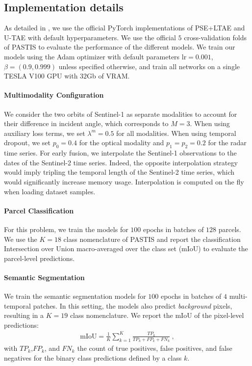 \subsection{Implementation details}
As detailed in , we use the official PyTorch implementations of PSE+LTAE and U-TAE with default hyperparameters.
We  use the official $5$ cross-validation folds of PASTIS \citep{garnot2021utae} to evaluate the performance of the different models. We train our models using the Adam optimizer \citep{kingma2014adam} with default parameters $\text{lr}=0.001$, $\beta=(0.9, 0.999)$ unless specified otherwise, and train all networks on a single TESLA V100 GPU with $32$Gb of VRAM. 

\paragraph{\bf Multimodality Configuration}  We consider the two orbits of Sentinel-1 as separate modalities to account for their difference in incident angle, which corresponds to $M=3$. When using auxiliary loss terms, we set $\lambda^m=0.5$ for all modalities. When using temporal dropout, we set $p_0=0.4$ for the optical modality and $p_1=p_2=0.2$ for the radar time series. For early fusion, we interpolate the Sentinel-1 observations to the dates of the Sentinel-2 time series. Indeed, the opposite interpolation strategy would imply tripling the temporal length of the Sentinel-2 time series, which would significantly increase memory usage. Interpolation is computed on the fly when loading dataset samples. 

\paragraph{\bf Parcel Classification} For this problem, we train the models for $100$ epochs in batches of $128$ parcels. We use the $K=18$ class nomenclature of PASTIS and report the classification Intersection over Union macro-averaged over the class set (mIoU) to evaluate the parcel-level predictions. 

\paragraph{\bf Semantic Segmentation} We train the semantic segmentation models for $100$ epochs in batches of $4$ multi-temporal patches. In this setting, the models also predict \emph{background} pixels, resulting in a $K=19$ class nomenclature. We report the mIoU of the pixel-level predictions: 
\begin{align}
    \text{mIoU} = \frac{1}{K} \sum_{k=1}^{K} \frac{TP_k}{TP_k + FP_k + FN_k}~,
\end{align}
with $TP_k$,$FP_k$, and $FN_k$ the count of true positives, false positives, and false negatives for the binary class predictions defined by a class $k$.
